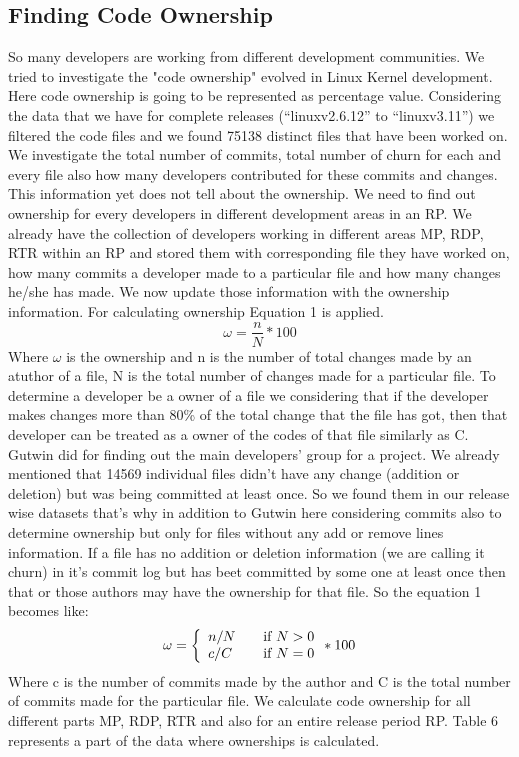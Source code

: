 \documentclass{acm_proc_article-sp}
\begin{document}
\subsection{Finding Code Ownership}
So many developers are working from different development communities. We tried to investigate the "code ownership" \cite{15_mockus} evolved in Linux Kernel development. Here code ownership is going to be represented as percentage value. Considering the data that we have for complete releases (``linuxv2.6.12'' to ``linuxv3.11'') we filtered the code files and we found 75138 distinct files that have been worked on. We investigate the total number of commits, total number of churn for each and every file also how many developers contributed for these commits and changes. This information yet does not tell about the ownership. We need to find out ownership for every developers in different development areas in an RP. We already have the collection of developers working in different areas MP, RDP, RTR within an RP and stored them with corresponding file they have worked on, how many commits a developer made to a particular file and how many changes he/she has made. We now update those information with the ownership information. For calculating ownership Equation 1 is applied.
\begin{equation}\omega=\frac{n}{N}*100\end{equation}
Where $\omega$ is the ownership and n is the number of total changes made by an atuthor of a file, N is the total number of changes made for a particular file.
To determine a developer be a owner of a file we considering that if the developer makes changes more than 80\% of the total change that the file has got, then that developer can be treated as a owner of the codes of that file similarly as C. Gutwin did \cite{16_gutwin} for finding out the main developers' group for a project. We already mentioned that 14569 individual files didn't have any change (addition or deletion) but was being committed at least once. So we found them in our release wise datasets that's why in addition to Gutwin here considering commits also to determine ownership but only for files without any add or remove lines information. If a file has no addition or deletion information (we are calling it churn) in it's commit log but has beet committed by some one at least once then that or those authors may have the ownership for that file. So the equation 1 becomes like:
\begin{equation} \omega = \left\{ \begin{array}{l l} n/N & \quad \text{if $N > 0$}\\ c/C & \quad \text{if $N = 0$} \end{array} * 100 \right.\end{equation}
Where c is the number of commits made by the author and C is the total number of commits made for the particular file.
We calculate code ownership for all different parts MP, RDP, RTR and also for an entire release period RP. Table 6 represents a part of the data where ownerships is calculated.
\end{document}
